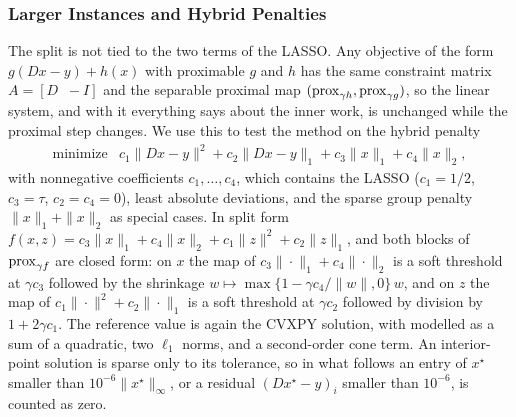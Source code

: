 \documentclass[11pt]{article}
\begin{document}
\subsubsection{Larger Instances and Hybrid Penalties}\label{sec:experiments-lasso-hybrid}
The split  is not tied to the two terms of the LASSO.
Any objective of the form $g(Dx - y) + h(x)$ with proximable $g$ and $h$ has the same constraint matrix $A = [D \;\; -I]$ and the separable proximal map $(\mathrm{prox}_{\gamma h}, \mathrm{prox}_{\gamma g})$, so the linear system, and with it everything  says about the inner work, is unchanged while the proximal step changes.
We use this to test the method on the hybrid penalty
\begin{equation}\label{eq:hybrid}
    \begin{array}{ll}
        \text{minimize} & c_1 \|Dx - y\|^2 + c_2 \|Dx - y\|_1 + c_3 \|x\|_1 + c_4 \|x\|_2,
    \end{array}
\end{equation}
with nonnegative coefficients $c_1, \ldots, c_4$, which contains the LASSO ($c_1 = 1/2$, $c_3 = \tau$, $c_2 = c_4 = 0$), least absolute deviations, and the sparse group penalty $\|x\|_1 + \|x\|_2$ as special cases.
In split form $f(x, z) = c_3\|x\|_1 + c_4\|x\|_2 + c_1\|z\|^2 + c_2\|z\|_1$, and both blocks of $\mathrm{prox}_{\gamma f}$ are closed form: on $x$ the map of $c_3\|\cdot\|_1 + c_4\|\cdot\|_2$ is a soft threshold at $\gamma c_3$ followed by the shrinkage $w \mapsto \max\{1 - \gamma c_4/\|w\|, 0\}\, w$, and on $z$ the map of $c_1\|\cdot\|^2 + c_2\|\cdot\|_1$ is a soft threshold at $\gamma c_2$ followed by division by $1 + 2\gamma c_1$.
The reference value is again the CVXPY solution, with  modelled as a sum of a quadratic, two $\ell_1$ norms, and a second-order cone term.
An interior-point solution is sparse only to its tolerance, so in what follows an entry of $x^\star$ smaller than $10^{-6}\|x^\star\|_\infty$, or a residual $(Dx^\star - y)_i$ smaller than $10^{-6}$, is counted as zero.
\end{document}
